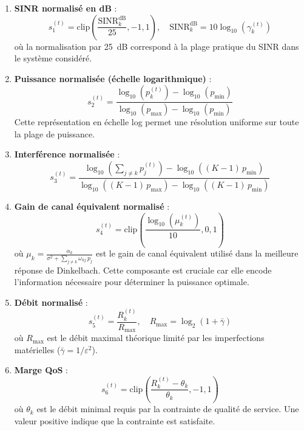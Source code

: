 \documentclass[conference]{IEEEtran}
\begin{document}
\begin{enumerate}
    \item \textbf{SINR normalisé en dB} :
    \begin{equation}
        s_1^{(t)} = \text{clip}\!\left(\frac{\text{SINR}_k^{\text{dB}}}{25}, -1, 1\right), \quad \text{SINR}_k^{\text{dB}} = 10\log_{10}(\gamma_k^{(t)})
        \label{eq:state_sinr}
    \end{equation}
    où la normalisation par 25~dB correspond à la plage pratique du SINR dans le système considéré.

    \item \textbf{Puissance normalisée (échelle logarithmique)} :
    \begin{equation}
        s_2^{(t)} = \frac{\log_{10}(p_k^{(t)}) - \log_{10}(p_{\min})}{\log_{10}(p_{\max}) - \log_{10}(p_{\min})}
        \label{eq:state_power}
    \end{equation}
    Cette représentation en échelle log permet une résolution uniforme sur toute la plage de puissance.

    \item \textbf{Interférence normalisée} :
    \begin{equation}
        s_3^{(t)} = \frac{\log_{10}\left(\sum_{j \neq k} p_j^{(t)}\right) - \log_{10}\left((K\!-\!1)\,p_{\min}\right)}{\log_{10}\left((K\!-\!1)\,p_{\max}\right) - \log_{10}\left((K\!-\!1)\,p_{\min}\right)}
        \label{eq:state_interf}
    \end{equation}

    \item \textbf{Gain de canal équivalent normalisé} :
    \begin{equation}
        s_4^{(t)} = \text{clip}\!\left(\frac{\log_{10}(\mu_k^{(t)})}{10}, 0, 1\right)
        \label{eq:state_mu}
    \end{equation}
    où $\mu_k = \frac{\alpha_k}{\sigma^2 + \sum_{j \neq k} \omega_{kj}\,p_j}$ est le gain de canal équivalent utilisé dans la meilleure réponse de Dinkelbach. Cette composante est cruciale car elle encode l'information nécessaire pour déterminer la puissance optimale.

    \item \textbf{Débit normalisé} :
    \begin{equation}
        s_5^{(t)} = \frac{R_k^{(t)}}{R_{\max}}, \quad R_{\max} = \log_2(1 + \bar{\gamma})
        \label{eq:state_rate}
    \end{equation}
    où $R_{\max}$ est le débit maximal théorique limité par les imperfections matérielles ($\bar{\gamma} = 1/\varepsilon^2$).

    \item \textbf{Marge QoS} :
    \begin{equation}
        s_6^{(t)} = \text{clip}\!\left(\frac{R_k^{(t)} - \theta_k}{\theta_k}, -1, 1\right)
        \label{eq:state_qos}
    \end{equation}
    où $\theta_k$ est le débit minimal requis par la contrainte de qualité de service. Une valeur positive indique que la contrainte est satisfaite.
\end{enumerate}
\end{document}
